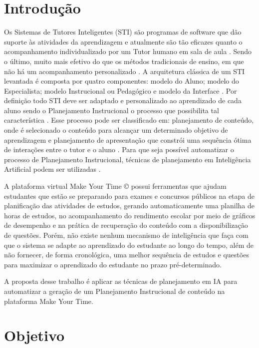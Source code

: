 \documentclass[
12pt,				%
oneside,			%
a4paper,			%
english,			%
brazil				%
]{abntex2ppgsi}
\begin{document}
\chapter{Introdução}

Os Sistemas de Tutores Inteligentes (STI) são programas de software que dão suporte às atividades da aprendizagem \cite{gamboa2002} e atualmente são tão eficazes quanto o acompanhamento individualizado por um Tutor humano em sala de aula \cite{vanlehn2011}. Sendo o último, muito mais efetivo do que os métodos tradicionais de ensino, em que não há um acompanhamento personalizado \cite{bloom1984}. A arquitetura clássica de um STI levantada é composta por quatro componentes: modelo do Aluno; modelo do Especialista; modelo Instrucional ou Pedagógico e modelo da Interface \cite{kaplan1995}. Por definição todo STI deve ser adaptado e personalizado ao aprendizado de cada aluno \cite{woo1991} sendo o Planejamento Instrucional o processo que possibilita tal característica \cite{mohan2003}. Esse processo pode ser classificado em: planejamento de conteúdo, onde é selecionado o conteúdo para alcançar um determinado objetivo de aprendizagem \cite{vassileva1996} e planejamento de apresentação que constrói uma sequência ótima de interações entre o tutor e o aluno \cite{mohan2003}. Para que seja possível automatizar o processo de Planejamento Instrucional, técnicas de planejamento em Inteligência Artificial podem ser utilizadas \cite{cho2000, vassileva1996, brusilovsky2003}.

A plataforma virtual Make Your Time © possui ferramentas que ajudam estudantes que estão se preparando para exames e concursos públicos na etapa de planificação das atividades de estudos, gerando automaticamente uma planilha de horas de estudos, no acompanhamento do rendimento escolar por meio de gráficos de desempenho e na prática de recuperação do conteúdo com a disponibilização de questões. Porém, não existe nenhum mecanismo de inteligência que faça com que o sistema se adapte ao aprendizado do estudante ao longo do tempo, além de não fornecer, de forma cronológica, uma melhor sequência de estudos e questões para maximizar o aprendizado do estudante no prazo pré-determinado.

A proposta desse trabalho é aplicar as técnicas de planejamento em IA para automatizar a geração de um Planejamento Instrucional de conteúdo na plataforma Make Your Time.

\chapter{Objetivo}
\end{document}
